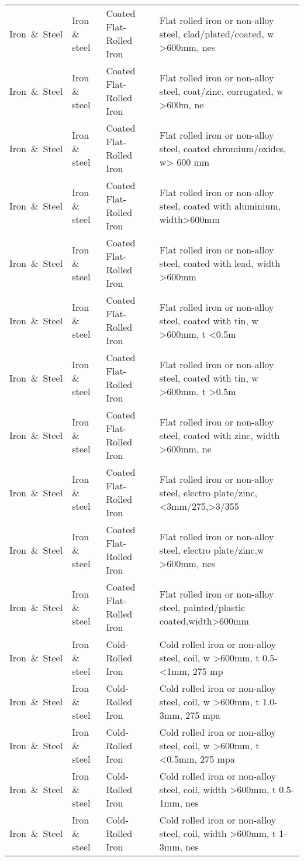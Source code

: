 \begin{appendices}
\begin{xltabular}{\textwidth}{|p{0.07\textwidth}|p{0.12\textwidth}|p{0.20\textwidth}|p{0.5\textwidth}|}
		Iron\ \&\ Steel & Iron \& steel & Coated Flat-Rolled Iron & Flat rolled iron or non-alloy steel, clad/plated/coated, w >600mm, nes \\
Iron\ \&\ Steel & Iron \& steel & Coated Flat-Rolled Iron & Flat rolled iron or non-alloy steel, coat/zinc, corrugated, w >600m, ne \\
Iron\ \&\ Steel & Iron \& steel & Coated Flat-Rolled Iron & Flat rolled iron or non-alloy steel, coated chromium/oxides, w> 600 mm \\
Iron\ \&\ Steel & Iron \& steel & Coated Flat-Rolled Iron & Flat rolled iron or non-alloy steel, coated with aluminium, width>600mm \\
Iron\ \&\ Steel & Iron \& steel & Coated Flat-Rolled Iron & Flat rolled iron or non-alloy steel, coated with lead, width >600mm \\
Iron\ \&\ Steel & Iron \& steel & Coated Flat-Rolled Iron & Flat rolled iron or non-alloy steel, coated with tin, w >600mm, t <0.5m \\
Iron\ \&\ Steel & Iron \& steel & Coated Flat-Rolled Iron & Flat rolled iron or non-alloy steel, coated with tin, w >600mm, t >0.5m \\
Iron\ \&\ Steel & Iron \& steel & Coated Flat-Rolled Iron & Flat rolled iron or non-alloy steel, coated with zinc, width >600mm, ne \\
Iron\ \&\ Steel & Iron \& steel & Coated Flat-Rolled Iron & Flat rolled iron or non-alloy steel, electro plate/zinc,<3mm/275,>3/355 \\
Iron\ \&\ Steel & Iron \& steel & Coated Flat-Rolled Iron & Flat rolled iron or non-alloy steel, electro plate/zinc,w >600mm, nes \\
Iron\ \&\ Steel & Iron \& steel & Coated Flat-Rolled Iron & Flat rolled iron or non-alloy steel, painted/plastic coated,width>600mm \\
Iron\ \&\ Steel & Iron \& steel & Cold-Rolled Iron & Cold rolled iron or non-alloy steel, coil, w >600mm, t 0.5-<1mm, 275 mp \\
Iron\ \&\ Steel & Iron \& steel & Cold-Rolled Iron & Cold rolled iron or non-alloy steel, coil, w >600mm, t 1.0-3mm, 275 mpa \\
Iron\ \&\ Steel & Iron \& steel & Cold-Rolled Iron & Cold rolled iron or non-alloy steel, coil, w >600mm, t <0.5mm, 275 mpa \\
Iron\ \&\ Steel & Iron \& steel & Cold-Rolled Iron & Cold rolled iron or non-alloy steel, coil, width >600mm, t 0.5-1mm, nes \\
Iron\ \&\ Steel & Iron \& steel & Cold-Rolled Iron & Cold rolled iron or non-alloy steel, coil, width >600mm, t 1-3mm, nes \\

\end{xltabular}
\end{appendices}
